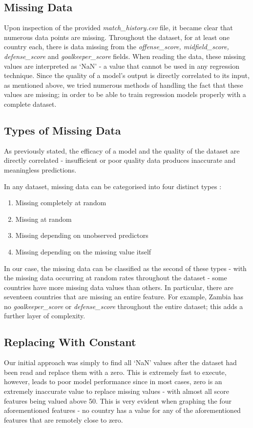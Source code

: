 \subsection{Missing Data}
Upon inspection of the provided \textit{match\_history.csv} file, it became clear that numerous data points are missing. Throughout the dataset, for at least one country each, there is data missing from the \textit{offense\_score, midfield\_score, defense\_score} and \textit{goalkeeper\_score} fields. When reading the data, these missing values are interpreted as `NaN' - a value that cannot be used in any regression technique. Since the quality of a model's output is directly correlated to its input, as mentioned above, we tried numerous methods of handling the fact that these values are missing; in order to be able to train regression models properly with a complete dataset.

\subsection{Types of Missing Data}
\label{sec:miss data}
As previously stated, the efficacy of a model and the quality of the dataset are directly correlated - insufficient or poor quality data produces inaccurate and meaningless predictions. 

In any dataset, missing data can be categorised into four distinct types \cite{missing_data}: 
\begin{enumerate}
    \item Missing completely at random
    \item Missing at random
    \item Missing depending on unobserved predictors
    \item Missing depending on the missing value itself
\end{enumerate}
In our case, the missing data can be classified as the second of these types - with the missing data occurring at random rates throughout the dataset - some countries have more missing data values than others. In particular, there are seventeen countries that are missing an entire feature. For example, Zambia has no \textit{goalkeeper\_score} or \textit{defense\_score} throughout the entire dataset; this adds a further layer of complexity.

\subsection{Replacing With Constant}
Our initial approach was simply to find all `NaN' values after the dataset had been read and replace them with a zero. This is extremely fast to execute, however, leads to poor model performance since in most cases, zero is an extremely inaccurate value to replace missing values - with almost all score features being valued above 50. This is very evident when graphing the four aforementioned features - no country has a value for any of the aforementioned features that are remotely close to zero.

